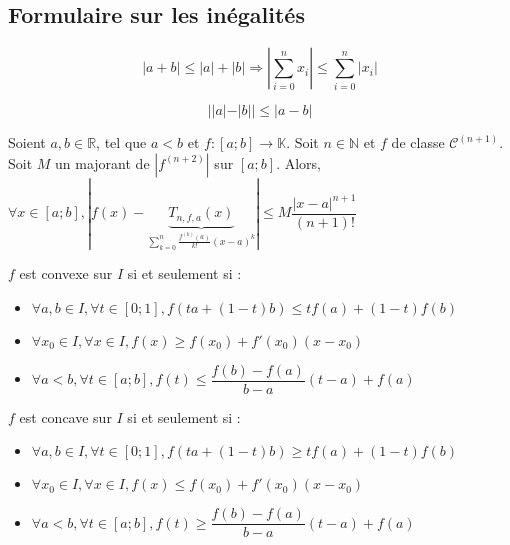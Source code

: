 \documentclass[landscape,twocolumn]{article}
\begin{document}
\begin{center}
\section*{Formulaire sur les inégalités} 
\end{center}

\begin{ine}
$$|a+b| \leqslant |a| + |b| \Longrightarrow \left| \sum \limits_{i=0}^n x_i  \right| \leqslant \sum \limits_{i=0}^n |x_i|$$ 
\end{ine}

\begin{ine}
$$||a|-|b|| \leqslant |a-b|$$ 
\end{ine}

\begin{ine}
\begin{center}
Soient $a, b \in \mathbb{R}$, tel que $a<b$ et $f : [a;b] \longrightarrow \mathbb{K}$. Soit $n \in \mathbb{N}$ et $f$ de classe $\mathcal{C}^{(n+1)}$. Soit $M$ un majorant de $|f^{(n+2)}|$ sur $[a;b]$. 
Alors, $\forall x \in [a;b], |f(x)- \underbrace{T_{n,f,a}(x)} \limits_{\sum \limits_{k=0}^n \frac{f^{(k)}(a)}{k!}(x-a)^k}| \leqslant M \dfrac{|x-a|^{n+1}}{(n+1)!}$
\end{center}
\end{ine}

\begin{ine}
$f$ est convexe sur $I$ si et seulement si : 
\begin{itemize}
\item $\forall a,b \in I, \forall t \in [0;1], f(ta+(1-t)b) \leqslant tf(a)+(1-t)f(b)$\\
\item $\forall x_0 \in I, \forall x \in I, f(x) \geqslant f(x_0)+f'(x_0)(x-x_0)$\\
\item $\forall a<b, \forall t \in [a;b], f(t) \leqslant \dfrac{f(b)-f(a)}{b-a}(t-a)+f(a)$
\end{itemize}
\end{ine}

\begin{ine}
$f$ est concave sur $I$ si et seulement si : 
\begin{itemize}
\item $ \forall a,b \in I, \forall t \in [0;1], f(ta+(1-t)b) \geqslant tf(a)+(1-t)f(b)$\\
\item $\forall x_0 \in I, \forall x \in I, f(x) \leqslant f(x_0)+f'(x_0)(x-x_0)$\\
\item $\forall a<b, \forall t \in [a;b], f(t) \geqslant \dfrac{f(b)-f(a)}{b-a}(t-a)+f(a)$
\end{itemize}
\end{ine}
\end{document}
